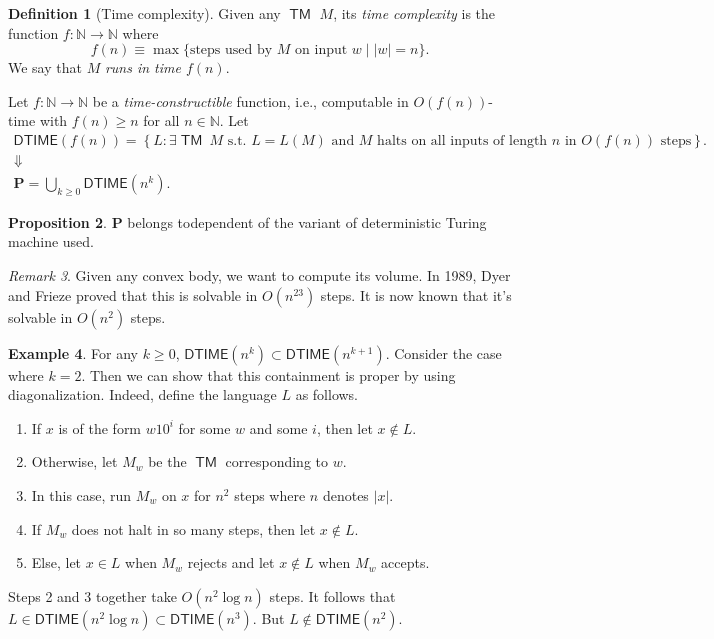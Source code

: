 \documentclass[10pt,letterpaper,cm]{nupset}
\theoremstyle{definition}
\newtheorem{definition}{Definition}[subsection]
\newtheorem{exmp}[definition]{Example}
\theoremstyle{theorem}
\newtheorem{prop}[definition]{Proposition}
\theoremstyle{remark}
\newtheorem{remark}[definition]{Remark}
\newcommand{\N}{\mathbb N}
\newcommand{\1}{\mathbf{1}}
\newcommand{\0}{\vec 0}
\DeclareMathOperator{\TM}{\mathsf{TM}}
\begin{document}
\smallskip

\begin{definition}[Time complexity]
Given any $\TM$ $M$, its \textit{time complexity} is the function $f: \N \to \N$ where $$f(n) \equiv\max\{\text{steps used by }M \text{ on input }w\mid \left\lvert{w}\right\rvert =n\}.$$ We say that $M$ \textit{runs in time $f(n)$}.
\end{definition}

\smallskip

Let $f: \N \to \N$ be a \textit{time-constructible} function, i.e., computable in $O(f(n))$-time with $f(n)\geq n$ for all $n\in \N$. Let 
\begin{gather*}
\mathsf{DTIME}(f(n))  = \left\{ L : \exists \TM \ M  \text{ s.t. } L = L(M) \text{ and }M \text{ halts on all inputs of length }n \text{ in }O(f(n)) \text{ steps}\right\}.
\\  \Downarrow
\\
 \mathbf{P}  = \bigcup_{k\geq 0} \mathsf{DTIME}(n^k)
.
\end{gather*}


\begin{prop}
$\mathbf{P}$ belongs todependent of the variant of deterministic Turing machine used. 
\end{prop}

\begin{remark}
Given any convex body, we want to compute its volume. In 1989, Dyer and Frieze proved that this is solvable in $O\left(n^{23}\right)$ steps. It is now known that it's solvable in $O\left(n^2\right)$ steps. 
\end{remark}

\begin{exmp}
For any $k\geq 0$, $\mathsf{DTIME}(n^k) \subset \mathsf{DTIME}(n^{k+1})$. Consider the case where $k=2$. Then we can show that this containment  is proper by using diagonalization. Indeed, define the language $L$ as follows. 
\begin{enumerate}
\item If $x$ is of the form $w10^i$ for some $w$ and some $i$, then let $x\notin L$.
\item Otherwise, let $M_w$ be the $\TM$ corresponding to $w$. 
\item In this case, run $M_w$ on $x$ for $n^2$ steps where $n$ denotes $\left\lvert{x}\right\rvert$. 
\item  If $M_w$ does not halt in so many steps, then let $x\notin L$. 
\item Else, let $x\in L$ when $M_w$ rejects and let $x\notin L$ when $M_w$ accepts. 
\end{enumerate}
Steps 2 and 3 together take $O\left(n^2 \log{n}\right)$ steps. It follows that $L \in \mathsf{DTIME}(n^2\log{n})\subset \mathsf{DTIME}(n^3)$. But $L \notin \mathsf{DTIME}(n^2)$.
\end{exmp}
\end{document}
